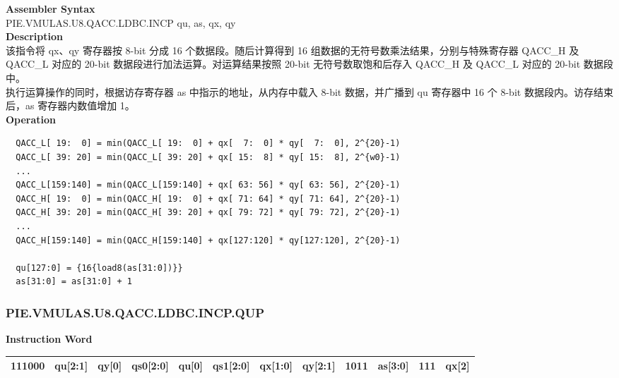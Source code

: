\textbf{Assembler Syntax} \\
PIE.VMULAS.U8.QACC.LDBC.INCP qu, as, qx, qy \\
\textbf{Description} \\
该指令将 qx、qy 寄存器按 8-bit 分成 16 个数据段。随后计算得到 16 组数据的无符号数乘法结果，分别与特殊寄存器 QACC\_H 及 QACC\_L 对应的 20-bit 数据段进行加法运算。对运算结果按照 20-bit 无符号数取饱和后存入 QACC\_H 及 QACC\_L 对应的 20-bit 数据段中。\\
执行运算操作的同时，根据访存寄存器 as 中指示的地址，从内存中载入 8-bit 数据，并广播到 qu 寄存器中 16 个 8-bit 数据段内。访存结束后，as 寄存器内数值增加 1。\\
\textbf{Operation}
\begin{lstlisting}
  QACC_L[ 19:  0] = min(QACC_L[ 19:  0] + qx[  7:  0] * qy[  7:  0], 2^{20}-1)
  QACC_L[ 39: 20] = min(QACC_L[ 39: 20] + qx[ 15:  8] * qy[ 15:  8], 2^{w0}-1)
  ...
  QACC_L[159:140] = min(QACC_L[159:140] + qx[ 63: 56] * qy[ 63: 56], 2^{20}-1)
  QACC_H[ 19:  0] = min(QACC_H[ 19:  0] + qx[ 71: 64] * qy[ 71: 64], 2^{20}-1)
  QACC_H[ 39: 20] = min(QACC_H[ 39: 20] + qx[ 79: 72] * qy[ 79: 72], 2^{20}-1)
  ...
  QACC_H[159:140] = min(QACC_H[159:140] + qx[127:120] * qy[127:120], 2^{20}-1)

  qu[127:0] = {16{load8(as[31:0])}}
  as[31:0] = as[31:0] + 1
\end{lstlisting}

\newpage
\subsubsection{PIE.VMULAS.U8.QACC.LDBC.INCP.QUP}\label{instruction:PIEVMULASU8QACCLDBCINCPQUP}
\setlength\tabcolsep{6pt}
\textbf{Instruction Word} \\
\begin{tabular}{|c|c|c|c|c|c|c|c|c|c|c|c|}
	\hline
	111000 & qu[2:1] & qy[0] & qs0[2:0] & qu[0] & qs1[2:0] & qx[1:0] & qy[2:1] & 1011 & as[3:0] & 111 & qx[2] \\
	\hline
\end{tabular}

